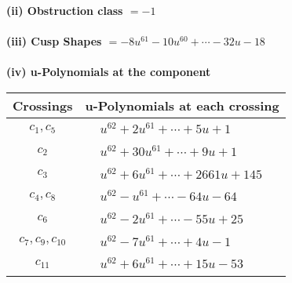 \documentclass[1p]{elsarticle_modified}
\theoremstyle{definition}
\begin{document}
\flushleft \textbf{(ii) Obstruction class $= -1$}\\~\\
\flushleft \textbf{(iii) Cusp Shapes $= -8 u^{61}-10 u^{60}+\cdots-32 u-18$}\\~\\
\newpage\renewcommand{\arraystretch}{1}
\flushleft \textbf{(iv) u-Polynomials at the component}\newline \\
\begin{tabular}{m{50pt}|m{274pt}}
Crossings & \hspace{64pt}u-Polynomials at each crossing \\
\hline $$\begin{aligned}c_{1},c_{5}\end{aligned}$$&$\begin{aligned}
&u^{62}+2 u^{61}+\cdots+5 u+1
\end{aligned}$\\
\hline $$\begin{aligned}c_{2}\end{aligned}$$&$\begin{aligned}
&u^{62}+30 u^{61}+\cdots+9 u+1
\end{aligned}$\\
\hline $$\begin{aligned}c_{3}\end{aligned}$$&$\begin{aligned}
&u^{62}+6 u^{61}+\cdots+2661 u+145
\end{aligned}$\\
\hline $$\begin{aligned}c_{4},c_{8}\end{aligned}$$&$\begin{aligned}
&u^{62}- u^{61}+\cdots-64 u-64
\end{aligned}$\\
\hline $$\begin{aligned}c_{6}\end{aligned}$$&$\begin{aligned}
&u^{62}-2 u^{61}+\cdots-55 u+25
\end{aligned}$\\
\hline $$\begin{aligned}c_{7},c_{9},c_{10}\end{aligned}$$&$\begin{aligned}
&u^{62}-7 u^{61}+\cdots+4 u-1
\end{aligned}$\\
\hline $$\begin{aligned}c_{11}\end{aligned}$$&$\begin{aligned}
&u^{62}+6 u^{61}+\cdots+15 u-53
\end{aligned}$\\
\hline
\end{tabular}\\~\\
\end{document}
